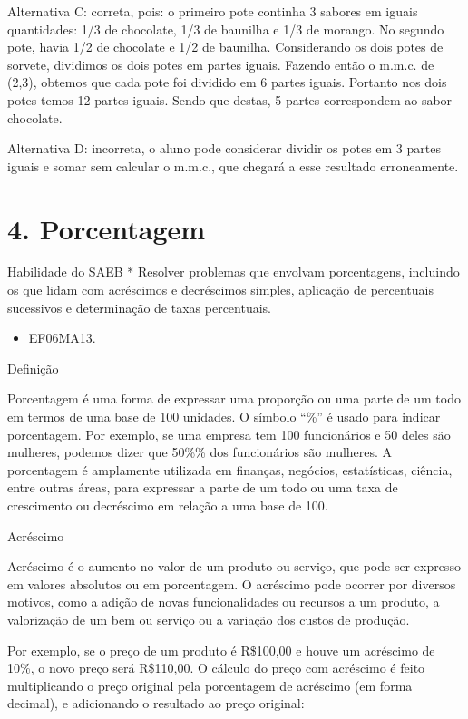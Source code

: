 Alternativa C: correta, pois: o primeiro pote continha 3 sabores em
iguais quantidades: 1/3 de chocolate, 1/3 de baunilha e 1/3 de morango.
No segundo pote, havia 1/2 de chocolate e 1/2 de baunilha. Considerando
os dois potes de sorvete, dividimos os dois potes em partes iguais.
Fazendo então o m.m.c. de (2,3), obtemos que cada pote foi dividido em 6
partes iguais. Portanto nos dois potes temos 12 partes iguais. Sendo que
destas, 5 partes correspondem ao sabor chocolate.

Alternativa D: incorreta, o aluno pode considerar dividir os potes em 3
partes iguais e somar sem calcular o m.m.c., que chegará a esse
resultado erroneamente.

\chapter{4. Porcentagem}

Habilidade do SAEB * Resolver problemas que envolvam porcentagens,
incluindo os que lidam com acréscimos e decréscimos simples, aplicação
de percentuais sucessivos e determinação de taxas percentuais.


\begin{itemize}
\item EF06MA13.
\end{itemize}

Definição

Porcentagem é uma forma de expressar uma proporção ou uma parte de um
todo em termos de uma base de 100 unidades. O símbolo ``\%'' é usado
para indicar porcentagem. Por exemplo, se uma empresa tem 100
funcionários e 50 deles são mulheres, podemos dizer que 50\%\% dos
funcionários são mulheres. A porcentagem é amplamente utilizada em
finanças, negócios, estatísticas, ciência, entre outras áreas, para
expressar a parte de um todo ou uma taxa de crescimento ou decréscimo em
relação a uma base de 100.

Acréscimo

Acréscimo é o aumento no valor de um produto ou serviço, que pode ser
expresso em valores absolutos ou em porcentagem. O acréscimo pode
ocorrer por diversos motivos, como a adição de novas funcionalidades ou
recursos a um produto, a valorização de um bem ou serviço ou a variação
dos custos de produção.

Por exemplo, se o preço de um produto é R\$100,00 e houve um acréscimo
de 10\%, o novo preço será R\$110,00. O cálculo do preço com acréscimo é
feito multiplicando o preço original pela porcentagem de acréscimo (em
forma decimal), e adicionando o resultado ao preço original:

